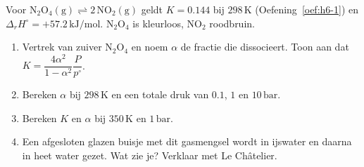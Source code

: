 \begin{oefening}
Voor \(\mathrm{N_2O_4(g) \rightleftharpoons 2\,NO_2(g)}\) geldt \(K = 0.144\) bij \(298\,\mathrm{K}\) (Oefening~\ref{oef:h6-1}) en \(\Delta_r H^\circ = +57.2\,\mathrm{kJ/mol}\). \(\mathrm{N_2O_4}\) is kleurloos, \(\mathrm{NO_2}\) roodbruin.

\begin{enumerate}
\item[(a)]
  Vertrek van zuiver \(\mathrm{N_2O_4}\) en noem \(\alpha\) de fractie die dissocieert. Toon aan dat \(K = \dfrac{4\alpha^2}{1-\alpha^2}\dfrac{P}{p^\circ}\).
\item[(b)]
  Bereken \(\alpha\) bij \(298\,\mathrm{K}\) en een totale druk van \(0.1\), \(1\) en \(10\,\mathrm{bar}\).
\item[(c)]
  Bereken \(K\) en \(\alpha\) bij \(350\,\mathrm{K}\) en \(1\,\mathrm{bar}\).
\item[(d)]
  Een afgesloten glazen buisje met dit gasmengsel wordt in ijswater en daarna in heet water gezet. Wat zie je? Verklaar met Le Châtelier.
\end{enumerate}
\end{oefening}
